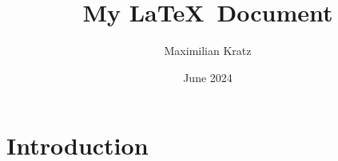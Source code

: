 \documentclass{article}
\title{My \LaTeX~Document}
\author{Maximilian Kratz}
\date{June 2024}
\begin{document}
\maketitle

\section{Introduction}
\end{document}

